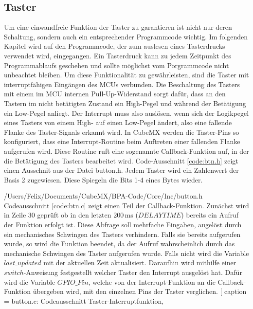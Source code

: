 
\subsection{Taster}
Um eine einwandfreie Funktion der Taster zu garantieren ist nicht nur deren Schaltung, sondern auch ein entsprechender Programmcode wichtig. Im folgenden Kapitel wird auf den Programmcode, der zum auslesen eines Tasterdrucks verwendet wird, eingegangen. Ein Tasterdruck kann zu jedem Zeitpunkt des Programmablaufs geschehen und sollte möglichst vom Porgrammcode nicht unbeachtet bleiben. Um diese Funktionalität zu gewährleisten, sind die Taster mit interruptfähigen Eingängen des MCUs verbunden. Die Beschaltung des Tasters mit einem im MCU internen Pull-Up-Widerstand sorgt dafür, dass an den Tastern im nicht betätigten Zustand ein High-Pegel und während der Betätigung ein Low-Pegel anliegt. Der Interrupt muss also auslösen, wenn sich der Logikpegel eines Tasters von einem High- auf einen Low-Pegel ändert, also eine fallende Flanke des Taster-Signals erkannt wird. In CubeMX werden die Taster-Pins so konfiguriert, dass eine Interrupt-Routine beim Auftreten einer fallenden Flanke aufgerufen wird. Diese Routine ruft eine sogenannte Callback-Funktion auf, in der die Betätigung des Tasters bearbeitet wird. Code-Ausschnitt \ref{code:btn.h} zeigt einen Ausschnit aus der Datei button.h. Jedem Taster wird ein Zahlenwert der Basis 2 zugewiesen. Diese Spiegeln die Bits 1-4 eines Bytes wieder.

{/Users/Felix/Documents/CubeMX/BPA-Code/Core/Inc/button.h} 
Codeausschnitt \ref{code:btn.c} zeigt einen Teil der Callback-Funktion. Zunächst wird in Zeile 30 geprüft ob in den letzten 200\,ms ($DELAYTIME$) bereits ein Aufruf der Funktion erfolgt ist. Diese Abfrage soll mehrfache Eingaben, augelöst durch ein mechanisches Schwingen des Tasters verhindern. Falls sie bereits aufgerufen wurde, so wird die Funktion beendet, da der Aufruf wahrscheinlich durch das mechanische Schwingen des Taster aufgerufen wurde. Falls nicht wird die Variable $last\_updated$ mit der aktuellen Zeit aktualisiert. Daraufhin wird mithilfe einer $switch$-Anweisung festgestellt welcher Taster den Interrupt ausgelöst hat. Dafür wird die Variable $GPIO\_Pin$, welche von der Interrupt-Funktion an die Callback-Funktion übergeben wird, mit den einzelnen Pins der Taster verglichen. 
[
caption = button.c: Codeausschnitt Taster-Interruptfunktion,
